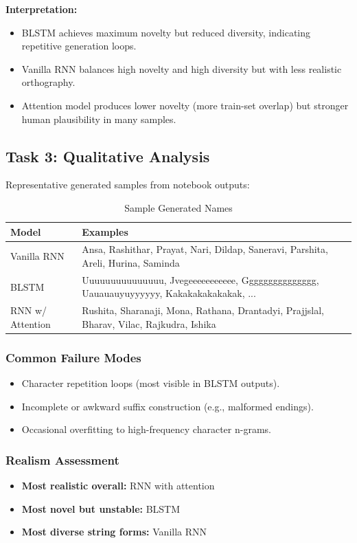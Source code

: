 \documentclass[11pt,a4paper]{article}
\begin{document}
\textbf{Interpretation:}
\begin{itemize}[leftmargin=1.5em]
    \item BLSTM achieves maximum novelty but reduced diversity, indicating repetitive generation loops.
    \item Vanilla RNN balances high novelty and high diversity but with less realistic orthography.
    \item Attention model produces lower novelty (more train-set overlap) but stronger human plausibility in many samples.
\end{itemize}

\subsection{Task 3: Qualitative Analysis}

Representative generated samples from notebook outputs:

\begin{table}[H]
\centering
\caption{Sample Generated Names}
\small
\begin{tabular}{p{3.1cm} p{10cm}}
\toprule
\textbf{Model} & \textbf{Examples} \\
\midrule
Vanilla RNN & Ansa, Rashithar, Prayat, Nari, Dildap, Saneravi, Parshita, Areli, Hurina, Saminda \\
BLSTM & Uuuuuuuuuuuuuuu, Jvegeeeeeeeeeee, Ggggggggggggggg, Uauauauyuyyyyyy, Kakakakakakakak, ... \\
RNN w/ Attention & Rushita, Sharanaji, Mona, Rathana, Drantadyi, Prajjslal, Bharav, Vilac, Rajkudra, Ishika \\
\bottomrule
\end{tabular}
\end{table}

\subsubsection{Common Failure Modes}
\begin{itemize}[leftmargin=1.5em]
    \item Character repetition loops (most visible in BLSTM outputs).
    \item Incomplete or awkward suffix construction (e.g., malformed endings).
    \item Occasional overfitting to high-frequency character n-grams.
\end{itemize}

\subsubsection{Realism Assessment}
\begin{itemize}[leftmargin=1.5em]
    \item \textbf{Most realistic overall:} RNN with attention
    \item \textbf{Most novel but unstable:} BLSTM
    \item \textbf{Most diverse string forms:} Vanilla RNN
\end{itemize}
\end{document}
